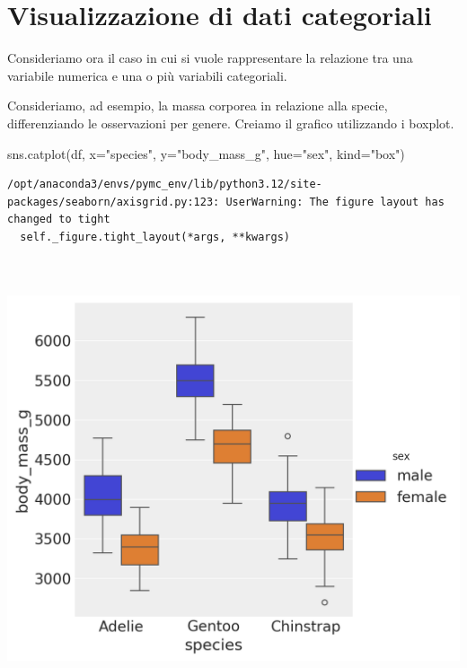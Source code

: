 \documentclass[
  letterpaper,
  krantz2]{{[}./krantz{]}}
\newenvironment{Shaded}{\begin{snugshade}}{\end{snugshade}}
\newcommand{\NormalTok}[1]{\textcolor[rgb]{0.00,0.23,0.31}{#1}}
\newcommand{\OperatorTok}[1]{\textcolor[rgb]{0.37,0.37,0.37}{#1}}
\newcommand{\StringTok}[1]{\textcolor[rgb]{0.13,0.47,0.30}{#1}}
\begin{document}
\section{Visualizzazione di dati
categoriali}\label{visualizzazione-di-dati-categoriali}

Consideriamo ora il caso in cui si vuole rappresentare la relazione tra
una variabile numerica e una o più variabili categoriali.

Consideriamo, ad esempio, la massa corporea in relazione alla specie,
differenziando le osservazioni per genere. Creiamo il grafico
utilizzando i boxplot.

\begin{Shaded}
\begin{Highlighting}[]
\NormalTok{sns.catplot(df, x}\OperatorTok{=}\StringTok{"species"}\NormalTok{, y}\OperatorTok{=}\StringTok{"body\_mass\_g"}\NormalTok{, hue}\OperatorTok{=}\StringTok{"sex"}\NormalTok{, kind}\OperatorTok{=}\StringTok{"box"}\NormalTok{)}
\end{Highlighting}
\end{Shaded}

\begin{verbatim}
/opt/anaconda3/envs/pymc_env/lib/python3.12/site-packages/seaborn/axisgrid.py:123: UserWarning: The figure layout has changed to tight
  self._figure.tight_layout(*args, **kwargs)
\end{verbatim}

\includegraphics[width=6.30208in,height=5.10417in]{chapters/python/08_seaborn_files/figure-pdf/cell-7-output-2.png}
\end{document}
